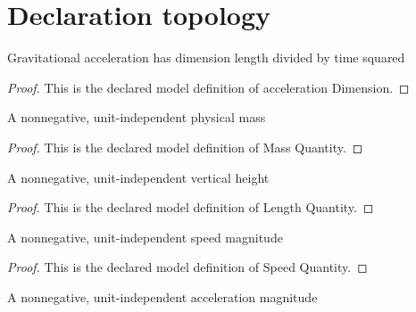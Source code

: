 \section{Declaration topology}
\begin{definition}
  \label{def:physics:phyx-mini-0815:phyxminiproblems-problemphyxmini0815-accelerationdimension}
  Gravitational acceleration has dimension length divided by time squared
\end{definition}
\begin{proof}
  This is the declared model definition of acceleration Dimension.
\end{proof}
\begin{definition}
  \label{def:physics:phyx-mini-0815:phyxminiproblems-problemphyxmini0815-massquantity}
  A nonnegative, unit-independent physical mass
\end{definition}
\begin{proof}
  This is the declared model definition of Mass Quantity.
\end{proof}
\begin{definition}
  \label{def:physics:phyx-mini-0815:phyxminiproblems-problemphyxmini0815-lengthquantity}
  A nonnegative, unit-independent vertical height
\end{definition}
\begin{proof}
  This is the declared model definition of Length Quantity.
\end{proof}
\begin{definition}
  \label{def:physics:phyx-mini-0815:phyxminiproblems-problemphyxmini0815-speedquantity}
  A nonnegative, unit-independent speed magnitude
\end{definition}
\begin{proof}
  This is the declared model definition of Speed Quantity.
\end{proof}
\begin{definition}
  \label{def:physics:phyx-mini-0815:phyxminiproblems-problemphyxmini0815-accelerationquantity}
  A nonnegative, unit-independent acceleration magnitude
\end{definition}
